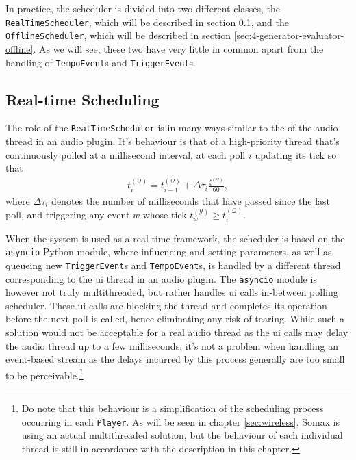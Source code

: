 In practice, the scheduler is divided into two different classes, the \texttt{RealTime\-Scheduler}, which will be described in section \ref{sec:4-generator-evaluator-rt}, and the \texttt{OfflineScheduler}, which will be described in section \ref{sec:4-generator-evaluator-offline}. As we will see, these two have very little in common apart from the handling of \texttt{TempoEvent}s and \texttt{TriggerEvent}s.

\subsection{Real-time Scheduling}\label{sec:4-generator-evaluator-rt}
The role of the \texttt{RealTimeScheduler} is in many ways similar to the of the audio thread in an audio plugin. It's behaviour is that of a high-priority thread that's continuously polled at a millisecond interval, at each poll $i$ updating its tick so that 
\begin{align}
	t_i^{(\mathcal Q)} = t_{i-1}^{(\mathcal Q)} + \Delta \tau_i \frac {\zeta^{(\mathcal Q)}}{60},
\end{align}
where $\Delta \tau_i$ denotes the number of milliseconds that have passed since the last poll, and triggering any event $w$ whose tick $t^{(\mathcal Y)}_w \ge t^{(\mathcal Q)}_i$.

When the system is used as a real-time framework, the scheduler is based on the \texttt{asyncio} Python module, where influencing and setting parameters, as well as queueing new \texttt{TriggerEvent}s and \texttt{TempoEvent}s, is handled by a different thread corresponding to the ui thread in an audio plugin. The \texttt{asyncio} module is however not truly multithreaded, but rather handles ui calls in-between polling scheduler. These ui calls are blocking the thread and completes its operation before the next poll is called, hence eliminating any risk of tearing. While such a solution would not be acceptable for a real audio thread as the ui calls may delay the audio thread up to a few milliseconds, it's not a problem when handling an event-based stream as the delays incurred by this process generally are too small to be perceivable.\footnote{Do note that this behaviour is a simplification of the scheduling process occurring in each \texttt{Player}. As will be seen in chapter \ref{sec:wireless}, Somax is using an actual multithreaded solution, but the behaviour of each individual thread is still in accordance with the description in this chapter.}

